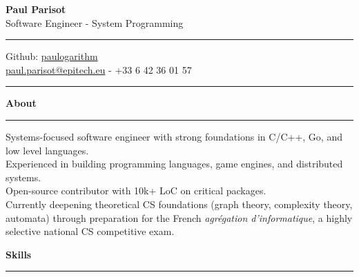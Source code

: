 \documentclass[9pt]{extarticle}
\begin{document}
\begin{center}
	{\huge\bfseries Paul Parisot}
	\\[10pt]
	{\Large Software Engineer - System Programming}
	\\
\end{center}


\par\vspace{-10pt}
\rule{\linewidth}{0.4pt}
\par\vspace{-10pt}

\begin{center}
	Github: \href{https://github.com/paulogarithm}{paulogarithm}
	\\
	\href{mailto:paul.parisot@epitech.eu}{paul.parisot@epitech.eu} - +33 6 42 36 01 57
	\\
\end{center}

\par\vspace{-15pt}
\rule{\linewidth}{0.4pt}
\par\vspace{5pt}


{\large\bfseries About}
\par\vspace{-8pt}
\rule{\linewidth}{0.4pt}
\par\vspace{5pt}

Systems-focused software engineer with strong foundations in C/C++, Go, and low level languages.
\\
Experienced in building programming languages, game engines, and distributed systems.
\\
Open-source contributor with 10k+ LoC on critical packages.
\\
Currently deepening theoretical CS foundations (graph theory, complexity theory, automata) through preparation for the French \textit{agrégation d'informatique}, a highly selective national CS competitive exam.
\par\vspace{5pt}


{\large\bfseries Skills }
\par\vspace{-8pt}
\rule{\linewidth}{0.4pt}
\par\vspace{5pt}
\end{document}
